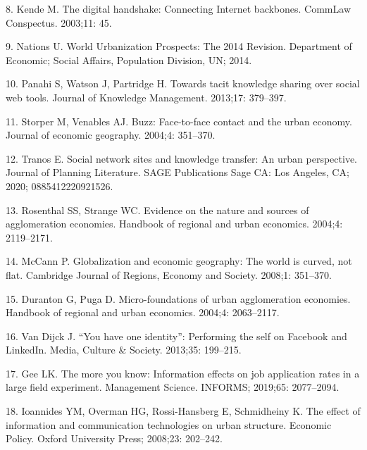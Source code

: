 \documentclass[10pt,letterpaper]{article}
\begin{document}
\leavevmode\hypertarget{ref-kende_digital_2003}{}%
8. Kende M. The digital handshake: Connecting Internet backbones.
CommLaw Conspectus. 2003;11: 45.

\leavevmode\hypertarget{ref-united_nations_world_2014}{}%
9. Nations U. World Urbanization Prospects: The 2014 Revision.
Department of Economic; Social Affairs, Population Division, UN; 2014.

\leavevmode\hypertarget{ref-panahi_towards_2013}{}%
10. Panahi S, Watson J, Partridge H. Towards tacit knowledge sharing
over social web tools. Journal of Knowledge Management. 2013;17:
379--397.

\leavevmode\hypertarget{ref-storper_buzz_2004}{}%
11. Storper M, Venables AJ. Buzz: Face-to-face contact and the urban
economy. Journal of economic geography. 2004;4: 351--370.

\leavevmode\hypertarget{ref-tranos2020social}{}%
12. Tranos E. Social network sites and knowledge transfer: An urban
perspective. Journal of Planning Literature. SAGE Publications Sage CA:
Los Angeles, CA; 2020; 0885412220921526.

\leavevmode\hypertarget{ref-rosenthal_evidence_2004}{}%
13. Rosenthal SS, Strange WC. Evidence on the nature and sources of
agglomeration economies. Handbook of regional and urban economics.
2004;4: 2119--2171.

\leavevmode\hypertarget{ref-mccann_globalization_2008}{}%
14. McCann P. Globalization and economic geography: The world is curved,
not flat. Cambridge Journal of Regions, Economy and Society. 2008;1:
351--370.

\leavevmode\hypertarget{ref-duranton_micro-foundations_2004}{}%
15. Duranton G, Puga D. Micro-foundations of urban agglomeration
economies. Handbook of regional and urban economics. 2004;4: 2063--2117.

\leavevmode\hypertarget{ref-van_dijck_you_2013}{}%
16. Van Dijck J. ``You have one identity'': Performing the self on
Facebook and LinkedIn. Media, Culture \& Society. 2013;35: 199--215.

\leavevmode\hypertarget{ref-gee2019more}{}%
17. Gee LK. The more you know: Information effects on job application
rates in a large field experiment. Management Science. INFORMS; 2019;65:
2077--2094.

\leavevmode\hypertarget{ref-ioannides2008effect}{}%
18. Ioannides YM, Overman HG, Rossi-Hansberg E, Schmidheiny K. The
effect of information and communication technologies on urban structure.
Economic Policy. Oxford University Press; 2008;23: 202--242.
\end{document}
